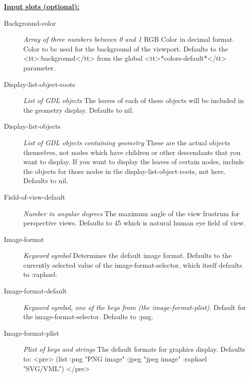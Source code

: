 \documentclass [11pt]{book}
\begin{document}
\begin{itemize}
\begin{description}
\end{description}








\textbf{
\underline{Input slots (optional):}}

\begin{description}

\item [Background-color]
\emph{Array of three numbers between 0 and 1} RGB Color in decimal
format. Color to be used for the background of the viewport.
Defaults to the
<tt>:background</tt> from the global <tt>*colors-default*</tt> parameter.


\item [Display-list-object-roots]
\emph{List of GDL objects} The leaves of each of these objects will
be included in the geometry display. Defaults to nil.


\item [Display-list-objects]
\emph{List of GDL objects containing geometry} These are the
actual objects themselves, not nodes which have children or
other descendants that you want to display. If you want to
display the leaves of certain nodes, include the objects for
those nodes in the display-list-object-roots, not here.
Defaults to nil.


\item [Field-of-view-default]
\emph{Number in angular degrees} The maximum angle of the view frustrum
for perspective views. Defaults to 45 which is natural human eye field of view.


\item [Image-format]
\emph{Keyword symbol} Determines the default image format. Defaults to the currently selected
value of the image-format-selector, which itself defaults to :raphael.


\item [Image-format-default]
\emph{Keyword symbol, one of the keys from (the image-format-plist)}.
Default for the image-format-selector. Defaults to :png.


\item [Image-format-plist]
\emph{Plist of keys and strings} The default formats for graphics display. Defaults to:
 <pre>
 (list :png "PNG image"
       :jpeg "jpeg image"
       :raphael "SVG/VML")
</pre>



\end{description}
\end{itemize}
\end{document}
